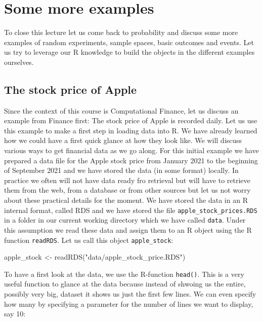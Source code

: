 \documentclass[
]{book}
\newenvironment{Shaded}{\begin{snugshade}}{\end{snugshade}}
\newcommand{\FunctionTok}[1]{\textcolor[rgb]{0.00,0.00,0.00}{#1}}
\newcommand{\NormalTok}[1]{#1}
\newcommand{\OtherTok}[1]{\textcolor[rgb]{0.56,0.35,0.01}{#1}}
\newcommand{\StringTok}[1]{\textcolor[rgb]{0.31,0.60,0.02}{#1}}
\begin{document}
\hypertarget{some-more-examples}{%
\section{Some more examples}\label{some-more-examples}}

To close this lecture let us come back to probability and discuss some more examples of
random experiments, sample spaces, basic outcomes and events. Let us try to leverage our
R knowledge to build the objects in the different examples ourselves.

\hypertarget{the-stock-price-of-apple}{%
\subsection{The stock price of Apple}\label{the-stock-price-of-apple}}

Since the context of this course is Computational Finance, let us discuss an example from
Finance first: The
stock price of Apple is recorded daily. Let us use this example to make a first step in
loading data into R. We have already learned how we could have a first quick glance at
how they look like. We will discuss various ways to get financial data as we go along. For this
initial example we have prepared a data file for the Apple stock price from January 2021 to
the beginning of September 2021 and we have stored the data (in some format) locally. In
practice we often will not have data ready fro retrieval but will have to retrieve them from the
web, from a database or from other sources but let us not worry about these practical details
for the moment. We have stored the data in an R internal format, called RDS and we have stored the
file \texttt{apple\_stock\_prices.RDS} in a folder in our current working directory which we have
called \texttt{data}. Under this assumption we read these data and assign them to an R object
using the R function \texttt{readRDS}. Let us call
this object \texttt{apple\_stock}:

\begin{Shaded}
\begin{Highlighting}[]
\NormalTok{apple\_stock }\OtherTok{\textless{}{-}} \FunctionTok{readRDS}\NormalTok{(}\StringTok{"data/apple\_stock\_price.RDS"}\NormalTok{)}
\end{Highlighting}
\end{Shaded}

To have a first look at the data, we use the R-function \texttt{head()}. This is a very useful function
to glance at the data because instead of shwoing us the entire, possibly very big, dataset it
shows us just the first few lines. We can even specify how many by specifying a parameter
for the number of lines we want to display, say 10:
\end{document}
